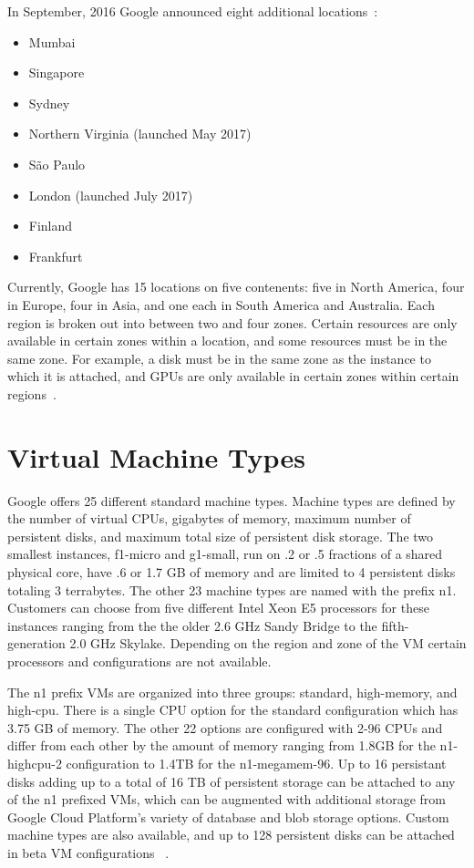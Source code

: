 In September, 2016 Google announced eight additional
locations~\cite{hid-sp18-419-gcp-history-medium}:
\begin{itemize}
  \item Mumbai
  \item Singapore
  \item Sydney
  \item Northern Virginia (launched May 2017)
  \item São Paulo
  \item London (launched July 2017)
  \item Finland
  \item Frankfurt
\end{itemize}

Currently, Google has 15 locations on five contenents: five in North
America, four in Europe, four in Asia, and one each in South America
and Australia. Each region is broken out into between two and four
zones. Certain resources are only available in certain zones within a
location, and some resources must be in the same zone. For example, a
disk must be in the same zone as the instance to which it is attached,
and GPUs are only available in certain zones within certain
regions~\cite{hid-sp18-419-gce-regions-zones}.


\section{Virtual Machine Types}

Google offers 25 different standard machine types. Machine types are
defined by the number of virtual CPUs, gigabytes of memory, maximum
number of persistent disks, and maximum total size of persistent disk
storage. The two smallest instances, f1-micro and g1-small, run on .2
or .5 fractions of a shared physical core, have .6 or 1.7 GB of memory
and are limited to 4 persistent disks totaling 3 terrabytes. The other
23 machine types are named with the prefix n1. Customers can choose
from five different Intel Xeon E5 processors for these instances
ranging from the the older 2.6 GHz Sandy Bridge to the
fifth-generation 2.0 GHz Skylake. Depending on the region and zone of
the VM certain processors and configurations are not available.  

The n1 prefix VMs are organized into three groups: standard,
high-memory, and high-cpu. There is a single CPU option for the
standard configuration which has 3.75 GB of memory. The other 22
options are configured with 2-96 CPUs and differ from each other by
the amount of memory ranging from 1.8GB for the n1-highcpu-2
configuration to 1.4TB for the n1-megamem-96. Up to 16 persistant
disks adding up to a total of 16 TB of persistent storage can be
attached to any of the n1 prefixed VMs, which can be augmented with
additional storage from Google Cloud Platform's variety of database
and blob storage options. Custom machine types are also available, and
up to 128 persistent disks can be attached in beta VM configurations
~\cite{hid-sp18-419-gce-machine-types}.

